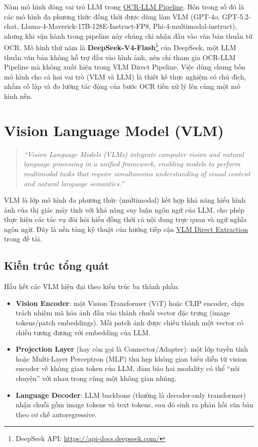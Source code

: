 ﻿\documentclass[12pt]{report}
\begin{document}
Năm mô hình đóng vai trò LLM trong \hyperref[sec:ocr_llm_pipeline]{OCR-LLM Pipeline}. Bốn trong số đó là các mô hình đa phương thức đồng thời được dùng làm VLM (GPT-4o, GPT-5.2-chat, Llama-4-Maverick-17B-128E-Instruct-FP8, Phi-4-multimodal-instruct), nhưng khi vận hành trong pipeline này chúng chỉ nhận đầu vào văn bản thuần từ OCR. Mô hình thứ năm là \textbf{DeepSeek-V4-Flash}\footnote{DeepSeek API: \url{https://api-docs.deepseek.com/}} của DeepSeek, một LLM thuần văn bản không hỗ trợ đầu vào hình ảnh, nên chỉ tham gia OCR-LLM Pipeline mà không xuất hiện trong VLM Direct Pipeline. Việc dùng chung bốn mô hình cho cả hai vai trò (VLM và LLM) là thiết kế thực nghiệm có chủ đích, nhằm cô lập và đo lường tác động của bước OCR tiền xử lý lên cùng một mô hình nền.

\section{Vision Language Model (VLM)}\label{sec:vlm}

\begin{quote}
\emph{``Vision Language Models (VLMs) integrate computer vision and natural language processing in a unified framework, enabling models to perform multimodal tasks that require simultaneous understanding of visual content and natural language semantics.''} \cite{vlmsurvey2025}
\end{quote}

VLM là lớp mô hình đa phương thức (multimodal) kết hợp khả năng hiểu hình ảnh của thị giác máy tính với khả năng suy luận ngôn ngữ của LLM, cho phép thực hiện các tác vụ đòi hỏi hiểu đồng thời cả nội dung trực quan và ngữ nghĩa ngôn ngữ. Đây là nền tảng kỹ thuật của hướng tiếp cận \hyperref[sec:vlm_pipeline]{VLM Direct Extraction} trong đề tài.

\subsection{Kiến trúc tổng quát}\label{sec:vlm_architecture}

Hầu hết các VLM hiện đại theo kiến trúc ba thành phần:

\begin{itemize}
    \item \textbf{Vision Encoder}: một Vision Transformer (ViT) hoặc CLIP encoder, chịu trách nhiệm mã hóa ảnh đầu vào thành chuỗi vector đặc trưng (image tokens/patch embeddings). Mỗi patch ảnh được chiếu thành một vector có chiều tương đương với embedding của LLM.
    \item \textbf{Projection Layer} (hay còn gọi là Connector/Adapter): một lớp tuyến tính hoặc Multi-Layer Perceptron (MLP) thu hẹp không gian biểu diễn từ vision encoder về không gian token của LLM, đảm bảo hai modality có thể ``nói chuyện'' với nhau trong cùng một không gian nhúng.
    \item \textbf{Language Decoder}: LLM backbone (thường là decoder-only transformer) nhận chuỗi gồm image tokens và text tokens, sau đó sinh ra phản hồi văn bản theo cơ chế autoregressive.
\end{itemize}
\end{document}
